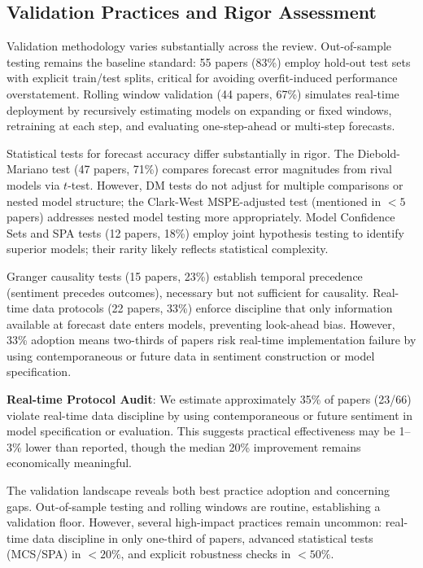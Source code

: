 \documentclass[11pt]{article}
\begin{document}
\subsection{Validation Practices and Rigor Assessment}

Validation methodology varies substantially across the review. Out-of-sample testing remains the baseline standard: 55 papers (83\%) employ hold-out test sets with explicit train/test splits, critical for avoiding overfit-induced performance overstatement. Rolling window validation (44 papers, 67\%) simulates real-time deployment by recursively estimating models on expanding or fixed windows, retraining at each step, and evaluating one-step-ahead or multi-step forecasts.

Statistical tests for forecast accuracy differ substantially in rigor. The Diebold-Mariano test (47 papers, 71\%) compares forecast error magnitudes from rival models via $t$-test. However, DM tests do not adjust for multiple comparisons or nested model structure; the Clark-West MSPE-adjusted test (mentioned in $<5$ papers) addresses nested model testing more appropriately. Model Confidence Sets and SPA tests (12 papers, 18\%) employ joint hypothesis testing to identify superior models; their rarity likely reflects statistical complexity.

Granger causality tests (15 papers, 23\%) establish temporal precedence (sentiment precedes outcomes), necessary but not sufficient for causality. Real-time data protocols (22 papers, 33\%) enforce discipline that only information available at forecast date enters models, preventing look-ahead bias. However, 33\% adoption means two-thirds of papers risk real-time implementation failure by using contemporaneous or future data in sentiment construction or model specification.



\footnotesize \textbf{Real-time Protocol Audit}: We estimate approximately 35\% of papers (23/66) violate real-time data discipline by using contemporaneous or future sentiment in model specification or evaluation. This suggests practical effectiveness may be 1--3\% lower than reported, though the median 20\% improvement remains economically meaningful.\normalsize

\normalsize The validation landscape reveals both best practice adoption and concerning gaps. Out-of-sample testing and rolling windows are routine, establishing a validation floor. However, several high-impact practices remain uncommon: real-time data discipline in only one-third of papers, advanced statistical tests (MCS/SPA) in $<20\%$, and explicit robustness checks in $<50\%$.
\end{document}
